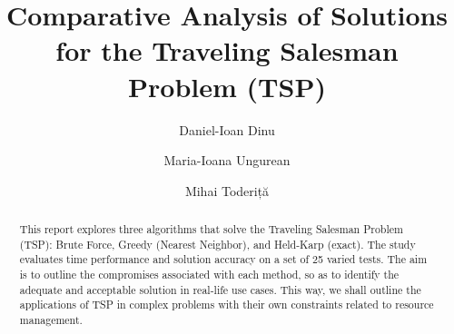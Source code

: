 \documentclass[runningheads]{llncs}
\begin{document}
\title{Comparative Analysis of Solutions for the Traveling Salesman Problem (TSP)}


\author{Daniel-Ioan Dinu \and
Maria-Ioana Ungurean \and
Mihai Toderiță}



\maketitle

\begin{abstract}
This report explores three algorithms that solve the Traveling Salesman Problem (TSP): Brute Force, Greedy (Nearest Neighbor), and Held-Karp (exact). The study evaluates time performance and solution accuracy on a set of 25 varied tests. 
The aim is to outline the compromises associated with each method, so as to identify the adequate and acceptable solution in real-life use cases. This way, we shall outline the applications of TSP in complex problems with their own constraints related to resource management.

\end{abstract}








 
 
\end{document}
